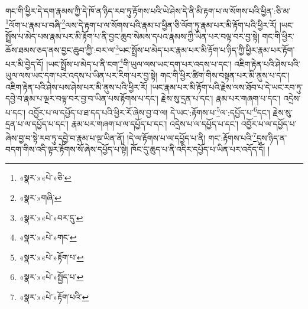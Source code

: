 གང་གི་ཕྱིར་དེ་དག་རྣམས་ཀྱི་དེ་ཁོ་ན་ཉིད་རབ་ཏུ་རྟོགས་པའི་ཡེ་ཤེས་དེ་ནི་མི་རྟག་པ་ལ་སོགས་པའི་ཕྱིན་:ཅི་མ་\footnote{«སྣར་»«པེ་»ཅི་}ལོག་པ་རྣམ་པ་བཞི་\footnote{«སྣར་»གཞི་}ལས་དེ་རྟག་པ་ལ་སོགས་པའི་རྣམ་པ་ཕྱིན་ཅི་ལོག་ཏུ་རྣམ་པར་མི་རྟོག་པའི་ཕྱིར་རོ། །ཡང་སྤྲོས་པ་མེད་པས་རྣམ་པར་མི་རྟོག་པ་ནི་བྱང་ཆུབ་སེམས་དཔའ་རྣམས་ཀྱི་ཡིན་པར་བལྟ་བར་བྱ་སྟེ། གང་གི་ཕྱིར་ཆོས་ཐམས་ཅད་ནས་བྱང་ཆུབ་ཀྱི་:བར་ལ་\footnote{«སྣར་»«པེ་»བར་དུ་}ཡང་སྤྲོས་པ་མེད་པར་རྣམ་པར་མི་རྟོག་པ་ཉིད་ཀྱི་ཕྱིར་རྣམ་པར་རྟོག་པར་མི་བྱེད་དོ། །ཡང་སྤྲོས་པ་མེད་པ་ནི་ངག་\footnote{«སྣར་»«པེ་»གང་}གི་ཡུལ་ལས་ཡང་དག་པར་འདས་པ་དང་། འཇིག་རྟེན་པའི་ཤེས་པའི་ཡུལ་ལས་ཡང་དག་པར་འདས་པ་ཡིན་པར་རིག་པར་བྱ་སྟེ། གང་གི་ཕྱིར་ཚིག་གིས་བསྟན་པར་མི་ནུས་པ་དང་། འཇིག་རྟེན་པའི་ཤེས་པས་ཤེས་པར་མི་ནུས་པའི་ཕྱིར་རོ། །ཡང་རྣམ་པར་མི་རྟོག་པའི་རྗེས་ལས་ཐོབ་པ་དེ་ཡང་རབ་ཏུ་དབྱེ་བ་རྣམ་པ་ལྔར་བལྟ་བར་བྱ་བ་ཡིན་པས་རྟོགས་པ་དང་། རྗེས་སུ་དྲན་པ་དང་། རྣམ་པར་གཞག་པ་དང་། འདྲེས་པ་དང་། འབྱོར་པ་ལ་དཔྱོད་པ་ཐ་དད་པའི་ཕྱིར་རོ་ཞེས་བྱ་བ་ལ། དེ་ཡང་:རྟོགས་པ་\footnote{«སྣར་»«པེ་»རྟོག་པ་}ལ་:དཔྱོད་པ་\footnote{«སྣར་»«པེ་»སྤྱོད་པ་}དང་། རྗེས་སུ་དྲན་པ་ལ་དཔྱོད་པ་དང་། རྣམ་པར་གཞག་པ་ལ་དཔྱོད་པ་དང་། འདྲེས་པ་ལ་དཔྱོད་པ་དང་། འབྱོར་པ་ལ་དཔྱོད་པ་ཞེས་བྱ་བ་སྟེ་རབ་ཏུ་དབྱེ་བ་རྣམ་པ་ལྔ་ཡིན་ནོ། །དེ་ལ་རྟོགས་པ་ལ་དཔྱོད་པ་ནི། གང་:རྟོགས་པའི་\footnote{«སྣར་»«པེ་»རྟོག་པའི་}དུས་ཉིད་ན་བདག་གིས་འདི་ལྟར་རྟོགས་སོ་ཞེས་དཔྱོད་པ་སྟེ། ཁོང་དུ་ཆུད་པ་ནི་འདིར་དཔྱོད་པ་ཡིན་པར་འདོད་དོ། །
